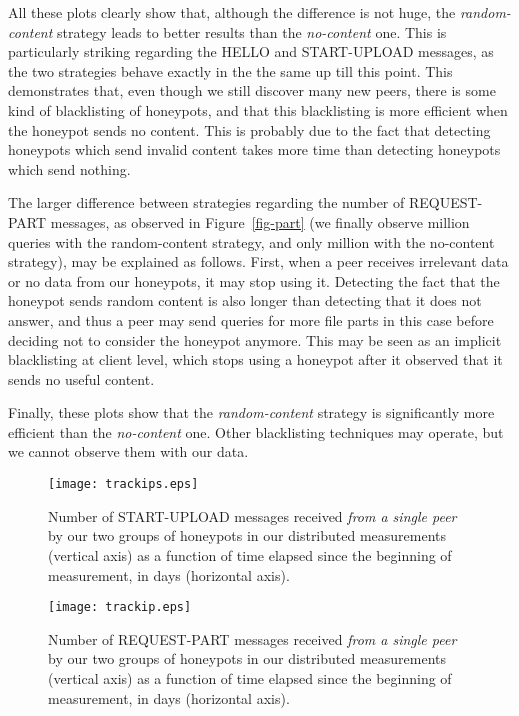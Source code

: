 \documentclass[final,
notitlepage,
narroweqnarray,
	inline,
	twoside,
]{ieee}
\begin{document}
All these plots clearly show that, although the difference is not
huge, the {\em random-content} strategy leads to better results than
the {\em no-content} one. This is particularly striking regarding the
HELLO and START-UPLOAD messages, as the two strategies behave exactly
in the the same up till this point. This demonstrates that, even though we
still discover many new peers, there is some kind of blacklisting of
honeypots, and that this blacklisting is more efficient when the
honeypot sends no content. This is probably due to the fact that
detecting honeypots which send invalid content takes more time than
detecting honeypots which send nothing.

The larger difference between strategies regarding the number of
REQUEST-PART messages, as observed in Figure~\ref{fig-part} (we
finally observe  million queries with the random-content
strategy, and only  million with the no-content strategy), may be
explained as follows. First, when a peer receives irrelevant data or
no data from our honeypots, it may stop using it.
Detecting the fact that the honeypot sends random content is also longer
than detecting that it does not answer, and thus a peer may send
queries for more file parts in this case before deciding not to
consider the honeypot anymore. This may be seen as an implicit
blacklisting at client level, which stops using a honeypot after it
observed that it sends no useful content.

Finally, these plots show that the {\em random-content} strategy
is significantly more efficient than the {\em no-content} one. Other
blacklisting techniques may operate, but we cannot observe them with
our data.

\medskip

\begin{figure}[h!]
  \centering
  \texttt{[image: trackips.eps]}
  \caption{Number of START-UPLOAD messages received {\em from a single
      peer} by our two groups of honeypots  in our distributed measurements (vertical axis) as a
    function of time elapsed since the beginning of measurement, in
    days (horizontal axis).}
  \label{fig-start-one}
\end{figure}

\begin{figure}[h!]
  \centering
  \texttt{[image: trackip.eps]}
  \caption{Number of REQUEST-PART messages received {\em from a single
      peer} by our two groups of honeypots  in our distributed measurements (vertical axis) as a
    function of time elapsed since the beginning of measurement, in
    days (horizontal axis).}
  \label{fig-part-one}
\end{figure}
\end{document}
